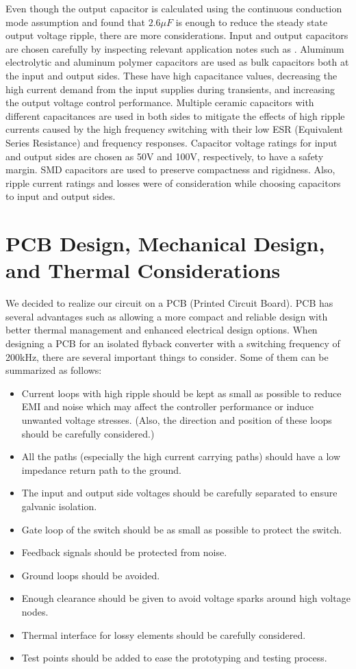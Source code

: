 \documentclass[12pt]{article}
\begin{document}
Even though the output capacitor is calculated using the continuous conduction mode assumption and found that $2.6\mu F$ is enough to reduce the steady state output voltage ripple, there are more considerations. Input and output capacitors are chosen carefully by inspecting relevant application notes such as \cite{caps}. Aluminum electrolytic and aluminum polymer capacitors are used as bulk capacitors both at the input and output sides. These have high capacitance values, decreasing the high current demand from the input supplies during transients, and increasing the output voltage control performance. Multiple ceramic capacitors with different capacitances are used in both sides to mitigate the effects of high ripple currents caused by the high frequency switching with their low ESR (Equivalent Series Resistance) and frequency responses. Capacitor voltage ratings for input and output sides are chosen as 50V and 100V, respectively, to have a safety margin. SMD capacitors are used to preserve compactness and rigidness. Also, ripple current ratings and losses were of consideration while choosing capacitors to input and output sides.

\section{PCB Design, Mechanical Design, and Thermal Considerations}
We decided to realize our circuit on a PCB (Printed Circuit Board). PCB has several advantages such as allowing a more compact and reliable design with better thermal management and enhanced electrical design options. When designing a PCB for an isolated flyback converter with a switching frequency of 200kHz, there are several important things to consider. Some of them can be summarized as follows:

\begin{itemize}
  \item Current loops with high ripple should be kept as small as possible to reduce EMI and noise which may affect the controller performance or induce unwanted voltage stresses. (Also, the direction and position of these loops should be carefully considered.)
  \item All the paths (especially the high current carrying paths) should have a low impedance return path to the ground.
  \item The input and output side voltages should be carefully separated to ensure galvanic isolation.
  \item Gate loop of the switch should be as small as possible to protect the switch.
  \item Feedback signals should be protected from noise.
  \item Ground loops should be avoided.
  \item Enough clearance should be given to avoid voltage sparks around high voltage nodes.
  \item Thermal interface for lossy elements should be carefully considered.
  \item Test points should be added to ease the prototyping and testing process.
\end{itemize}
\end{document}
